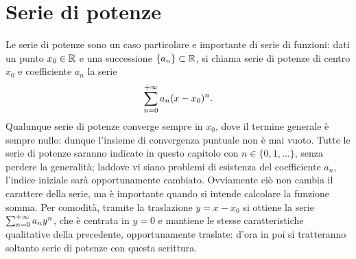 \section{Serie di potenze}
Le serie di potenze sono un caso particolare e importante di serie di funzioni: dati un punto $x_0\in\mathbb{R}$ e una successione $\{a_n\}\subset\mathbb{R}$, si chiama serie di potenze di centro $x_0$ e coefficiente $a_n$ la serie
\[
\sum_{{n}=0}^{+\infty}a_n(x-x_0)^n.
\]
Qualunque serie di potenze converge sempre in $x_0$, dove il termine generale è sempre nullo: dunque l'insieme di convergenza puntuale non è mai vuoto.
Tutte le serie di potenze saranno indicate in questo capitolo con $n\in\{0,1,\dots\}$, senza perdere la generalità; laddove vi siano problemi di esistenza del coefficiente $a_n$, l'indice iniziale sarà opportunamente cambiato. Ovviamente ciò non cambia il carattere della serie, ma è importante quando si intende calcolare la funzione somma.
Per comodità, tramite la traslazione $y=x-x_0$ si ottiene la serie $\sum_{{n}=0}^{+\infty}a_ny^n$, che è centrata in $y=0$ e mantiene le stesse caratteristiche qualitative della precedente, opportunamente traslate: d'ora in poi si tratteranno soltanto serie di potenze con questa scrittura.
